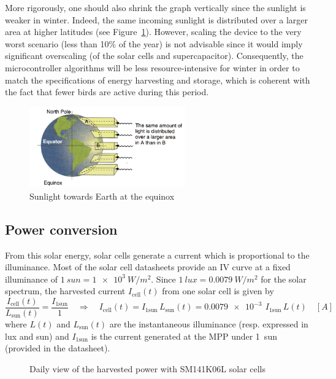\documentclass{EPL-master-thesis-covers-EN}
\newcommand{\te}[1]{\textrm{#1}}
\begin{document}
More rigorously, one should also shrink the graph vertically since the sunlight is weaker in winter. Indeed, the same incoming sunlight is distributed over a larger area at higher latitudes (see Figure~\ref{fig:sunlight_png}). However, scaling the device to the very worst scenario (less than 10\% of the year) is not advisable since it would imply significant overscaling (of the solar cells and supercapacitor). Consequently, the microcontroller algorithms will be less resource-intensive for winter in order to match the specifications of energy harvesting and storage, which is coherent with the fact that fewer birds are active during this period.

\begin{figure}[H]
    \centering
    \includegraphics[width=0.6\textwidth]{sunlight.png}
    \caption[Sunlight towards Earth at the equinox]{Sunlight towards Earth at the equinox~\cite{ackerman2007meteorology}}
    \label{fig:sunlight_png}
\end{figure}


\subsection*{Power conversion}

From this solar energy, solar cells generate a current which is proportional to the illuminance. Most of the solar cell datasheets provide an IV curve at a fixed illuminance of $\SI{1}{sun} = \SI{1e3}{W/m^2}$. Since $\SI{1}{lux} = \SI{0.0079}{W/m^2}$ for the solar spectrum, the harvested current $I_\te{cell}(t)$ from one solar cell is given by
\[
  \frac{I_\te{cell}(t)}{L_\te{sun}(t)} = \frac{I_{1\te{sun}}}{1} \quad \Rightarrow \quad I_\te{cell}(t) = I_{1\te{sun}}\,L_\te{sun}(t) = \SI{0.0079e-3}{}\,I_{1\te{sun}}\,L(t) \quad \si{[A]}
\]
where $L(t)$ and $L_{\te{sun}}(t)$ are the instantaneous illuminance (resp. expressed in lux and sun) and $I_{1\te{sun}}$ is the current generated at the MPP under \SI{1}{sun} (provided in the datasheet).

\begin{figure}[H]
    \centering
    
    \caption{Daily view of the harvested power with SM141K06L solar cells}
    \label{fig:P_cell}
\end{figure}
\end{document}
